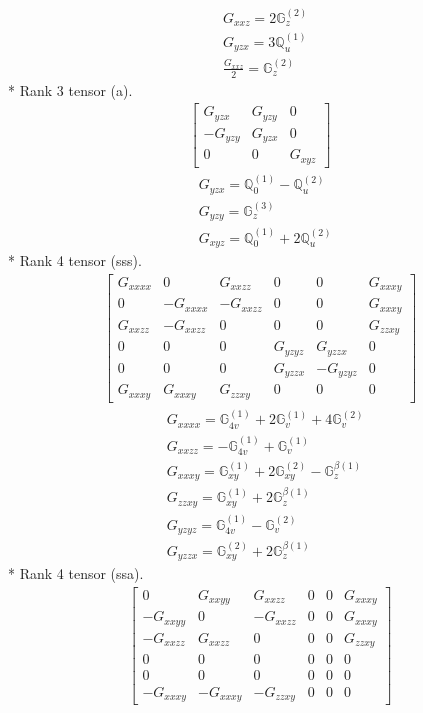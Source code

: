 \documentclass[fleqn,8pt,landscape]{jsarticle}
\begin{document}
\begin{align*}
& G_{xxz} = 2 \mathbb{G}_{z}^{(2)} \\
& G_{yzx} = 3 \mathbb{Q}_{u}^{(1)} \\
& \frac{G_{xxz}}{2} = \mathbb{G}_{z}^{(2)}
\end{align*}
* Rank 3 tensor (a).
\begin{align*}
\begin{bmatrix} G_{yzx} & G_{yzy} & 0 \\ - G_{yzy} & G_{yzx} & 0 \\ 0 & 0 & G_{xyz} \end{bmatrix}
\end{align*}
\begin{align*}
& G_{yzx} = \mathbb{Q}_{0}^{(1)} - \mathbb{Q}_{u}^{(2)} \\
& G_{yzy} = \mathbb{G}_{z}^{(3)} \\
& G_{xyz} = \mathbb{Q}_{0}^{(1)} + 2 \mathbb{Q}_{u}^{(2)}
\end{align*}
* Rank 4 tensor (sss).
\begin{align*}
\begin{bmatrix} G_{xxxx} & 0 & G_{xxzz} & 0 & 0 & G_{xxxy} \\ 0 & - G_{xxxx} & - G_{xxzz} & 0 & 0 & G_{xxxy} \\ G_{xxzz} & - G_{xxzz} & 0 & 0 & 0 & G_{zzxy} \\ 0 & 0 & 0 & G_{yzyz} & G_{yzzx} & 0 \\ 0 & 0 & 0 & G_{yzzx} & - G_{yzyz} & 0 \\ G_{xxxy} & G_{xxxy} & G_{zzxy} & 0 & 0 & 0 \end{bmatrix}
\end{align*}
\begin{align*}
& G_{xxxx} = \mathbb{G}_{4v}^{(1)} + 2 \mathbb{G}_{v}^{(1)} + 4 \mathbb{G}_{v}^{(2)} \\
& G_{xxzz} = - \mathbb{G}_{4v}^{(1)} + \mathbb{G}_{v}^{(1)} \\
& G_{xxxy} = \mathbb{G}_{xy}^{(1)} + 2 \mathbb{G}_{xy}^{(2)} - \mathbb{G}_{z}^{\beta(1)} \\
& G_{zzxy} = \mathbb{G}_{xy}^{(1)} + 2 \mathbb{G}_{z}^{\beta(1)} \\
& G_{yzyz} = \mathbb{G}_{4v}^{(1)} - \mathbb{G}_{v}^{(2)} \\
& G_{yzzx} = \mathbb{G}_{xy}^{(2)} + 2 \mathbb{G}_{z}^{\beta(1)}
\end{align*}
* Rank 4 tensor (ssa).
\begin{align*}
\begin{bmatrix} 0 & G_{xxyy} & G_{xxzz} & 0 & 0 & G_{xxxy} \\ - G_{xxyy} & 0 & - G_{xxzz} & 0 & 0 & G_{xxxy} \\ - G_{xxzz} & G_{xxzz} & 0 & 0 & 0 & G_{zzxy} \\ 0 & 0 & 0 & 0 & 0 & 0 \\ 0 & 0 & 0 & 0 & 0 & 0 \\ - G_{xxxy} & - G_{xxxy} & - G_{zzxy} & 0 & 0 & 0 \end{bmatrix}
\end{align*}
\end{document}
